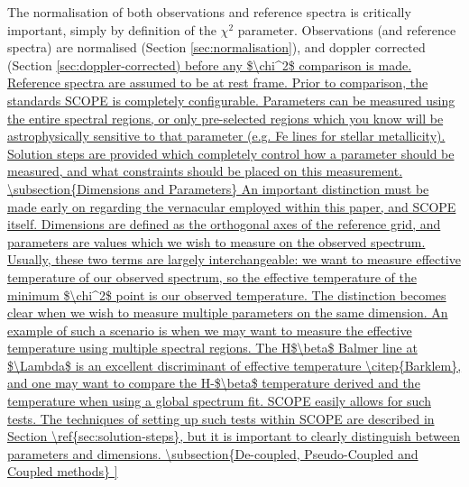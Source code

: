 \documentclass{emulateapj}
\begin{document}
The normalisation of both observations and reference spectra is critically important, simply by definition of the $\chi^2$ parameter. Observations (and reference spectra) are normalised (Section \ref{sec:normalisation}), and doppler corrected (Section \ref{sec:doppler-corrected) before any $\chi^2$ comparison is made. Reference spectra are assumed to be at rest frame.

Prior to comparison, the standards 



SCOPE is completely configurable. Parameters can be measured using the entire spectral regions, or only pre-selected regions which you know will be astrophysically sensitive to that parameter (e.g. Fe lines for stellar metallicity). Solution steps are provided which completely control how a parameter should be measured, and what constraints should be placed on this measurement.

\subsection{Dimensions and Parameters}

An important distinction must be made early on regarding the vernacular employed within this paper, and SCOPE itself. Dimensions are defined as the orthogonal axes of the reference grid, and parameters are values which we wish to measure on the observed spectrum. Usually, these two terms are largely interchangeable: we want to measure effective temperature of our observed spectrum, so the effective temperature of the minimum $\chi^2$ point is our observed temperature. The distinction becomes clear when we wish to measure multiple parameters on the same dimension. 

An example of such a scenario is when we may want to measure the effective temperature using multiple spectral regions. The H$\beta$ Balmer line at $\Lambda$ is an excellent discriminant of effective temperature \citep{Barklem}, and one may want to compare the H-$\beta$ temperature derived and the temperature when using a global spectrum fit. SCOPE easily allows for such tests. The techniques of setting up such tests within SCOPE are described in Section \ref{sec:solution-steps}, but it is important to clearly distinguish between parameters and dimensions.

\subsection{De-coupled, Pseudo-Coupled and Coupled methods}





}
\end{document}
